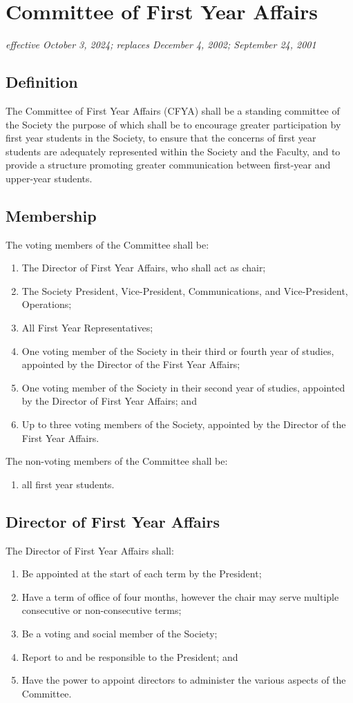 \section{Committee of First Year Affairs}
\emph{effective October 3, 2024; replaces December 4, 2002; September 24, 2001}

\subsection{Definition}
The Committee of First Year Affairs (CFYA) shall be a standing committee of the Society the purpose of which shall be to encourage greater participation by first year students in the Society, to ensure that the concerns of first year students are adequately represented within the Society and the Faculty, and to provide a structure promoting greater communication between first-year and upper-year students.

\subsection{Membership}
The voting members of the Committee shall be:
\begin{enumerate}
\item The Director of First Year Affairs, who shall act as chair;
\item The Society President, Vice-President, Communications, and Vice-President, Operations;
\item All First Year Representatives;
\item One voting member of the Society in their third or fourth year of studies, appointed by the Director of the First Year Affairs;
\item One voting member of the Society in their second year of studies, appointed by the Director of First Year Affairs; and
\item Up to three voting members of the Society, appointed by the Director of the First Year Affairs.
\end{enumerate}
The non-voting members of the Committee shall be:
\begin{enumerate}
\item all first year students.
\end{enumerate}

\subsection{Director of First Year Affairs}
The Director of First Year Affairs shall:
\begin{enumerate}
\item Be appointed at the start of each term by the President;
\item Have a term of office of four months, however the chair may serve multiple consecutive or non-consecutive terms;
\item Be a voting and social member of the Society;
\item Report to and be responsible to the President; and
\item Have the power to appoint directors to administer the various aspects of the Committee.
\end{enumerate}
